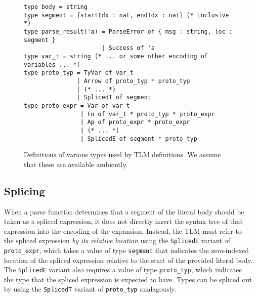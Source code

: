 \documentclass[acmsmall,10pt,review,anonymous]{acmart}\settopmatter{printfolios=true}
\newcommand{\li}[1]{\lstinline{#1}}
\begin{document}
\begin{figure}
\begin{lstlisting}[numbers=none]
type body = string
type segment = {startIdx : nat, endIdx : nat} (* inclusive *)
type parse_result('a) = ParseError of { msg : string, loc : segment }
                      | Success of 'a
type var_t = string (* ... or some other encoding of variables ... *)
type proto_typ = TyVar of var_t 
               | Arrow of proto_typ * proto_typ 
               | (* ... *) 
               | SplicedT of segment
type proto_expr = Var of var_t 
                | Fn of var_t * proto_typ * proto_expr
                | Ap of proto_expr * proto_expr
                | (* ... *) 
                | SplicedE of segment * proto_typ

\end{lstlisting}
\vspace{-5px}
\caption[Definitions of various types used by TLM definitions.]{Definitions of various types used by TLM definitions. We assume that these are available ambiently.}
\label{fig:indexrange-and-parseresult}
\label{fig:candidate-exp-verseml}
\vspace{-5px}
\end{figure}

\subsection{Splicing}\label{sec:splicing-and-hygiene}
When a parse function determines that a segment of the literal body should be taken as a spliced expression, it does not directly insert the syntax tree of that expression into the encoding of the expansion. Instead, 
the TLM must refer to the spliced expression \emph{by its relative location} using the \li{SplicedE} variant of \li{proto_expr}, which takes a value of type \li{segment} that indicates the zero-indexed location of the spliced expression relative to the start of the provided literal body. The \li{SplicedE} variant also requires a value of type \li{proto_typ}, which indicates the type that the spliced expression is expected to have. Types can be spliced out by using the \li{SplicedT} variant of \li{proto_typ} analagously.
\end{document}
